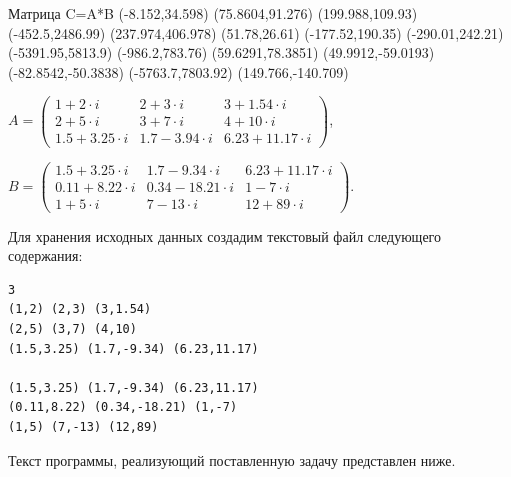 \begin{scriptverbatim}
Матрица C=A*B
(-8.152,34.598)   (75.8604,91.276)   (199.988,109.93)    (-452.5,2486.99)  (237.974,406.978)
(51.78,26.61)     (-177.52,190.35)   (-290.01,242.21)    (-5391.95,5813.9) (-986.2,783.76)
(59.6291,78.3851) (49.9912,-59.0193) (-82.8542,-50.3838) (-5763.7,7803.92) (149.766,-140.709)
\end{scriptverbatim}



 $A=\left(\begin{matrix}1+2\cdot i&2+3\cdot i&3+1.54\cdot i\\2+5\cdot i&3+7\cdot i&4+10\cdot i\\1.5+3.25\cdot
i&1.7-3.94\cdot i&6.23+11.17\cdot i\end{matrix}\right)$,

 $B=\left(\begin{matrix}1.5+3.25\cdot i&1.7-9.34\cdot i&6.23+11.17\cdot i\\0.11+8.22\cdot i&0.34-18.21\cdot i&1-7\cdot
i\\1+5\cdot i&7-13\cdot i&12+89\cdot i\end{matrix}\right)$.

Для хранения исходных данных создадим текстовый файл  %
следующего содержания:
\label{ch09:file1}\begin{verbatim}
3
(1,2) (2,3) (3,1.54)
(2,5) (3,7) (4,10)
(1.5,3.25) (1.7,-9.34) (6.23,11.17)

(1.5,3.25) (1.7,-9.34) (6.23,11.17)
(0.11,8.22) (0.34,-18.21) (1,-7)
(1,5) (7,-13) (12,89)
\end{verbatim}

Текст программы, реализующий поставленную задачу представлен ниже. 

